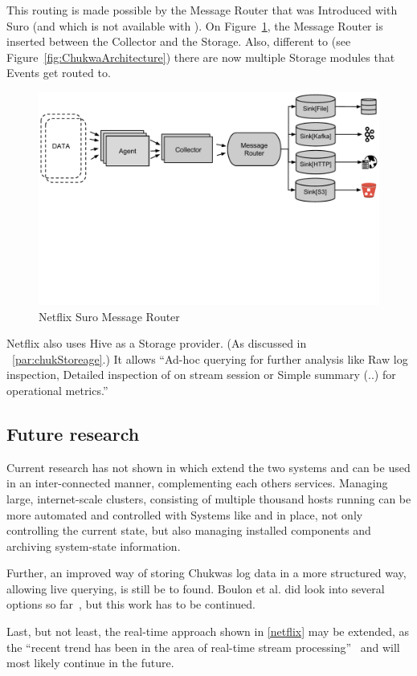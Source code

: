 This routing is made possible by the Message Router that was Introduced with Suro (and which is not available with \chuk). On Figure~\ref{fig:SuroMessageRouter}, the Message Router is inserted between the Collector and the Storage. Also, different to \chuk (see Figure~\ref{fig:ChukwaArchitecture}) there are now multiple Storage modules that Events get routed to.
\begin{figure}
  \centering
  \includegraphics[width=\linewidth,clip=true,trim=0 75mm 0 0]{images/SuroMessageRouter}
  \caption{Netflix Suro Message Router~\cite{Bae2013}}
  \label{fig:SuroMessageRouter}
\end{figure}

Netflix also uses Hive as a Storage provider. (As discussed in ~\ref{par:chukStoreage}.) 
It allows ``Ad-hoc querying for further analysis like Raw log inspection, Detailed inspection of on stream session or Simple summary (..) for operational metrics.''~\cite{Tse2010}


\subsection{Future research}
Current research has not shown in which extend the two systems \amblong and \chuk can be used in an inter-connected manner, complementing each others services. 
Managing large, internet-scale clusters, consisting of multiple thousand hosts running \hadooplong can be more automated and controlled with Systems like \amb and \chuk in place, not only controlling the current state, but also managing installed components and archiving system-state information.

Further, an improved way of storing Chukwas log data in a more structured way, allowing live querying, is still be to found. Boulon et al. did look into several options so far~\cite{Boulonb}, but this work has to be continued.

Last, but not least, the real-time approach shown in \ref{netflix} may be extended, as the ``recent trend has been in the area of real-time stream processing''~\cite{Bae2013} and will most likely continue in the future.